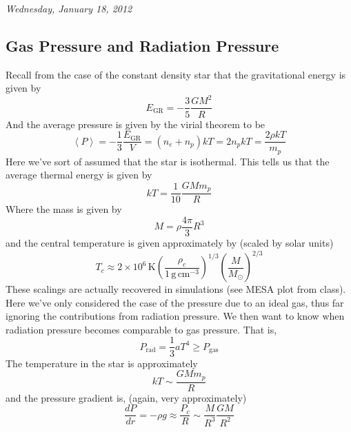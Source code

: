 \documentclass[10pt]{article}
\numberwithin{equation}{section}
\newcommand{\n}{\noindent}
\newcommand{\avg}[1]{\left\langle#1\right\rangle}
\begin{document}
\n\textit{Wednesday, January 18, 2012}
	\subsection{Gas Pressure and Radiation Pressure}
		Recall from the case of the constant density star that the 
gravitational energy is given by
		\begin{equation}
			\label{GPRP.1} E_{\mathrm{GR}}=-\frac{3}{5}\frac{GM^2}{R}
		\end{equation}
		And the average pressure is given by the virial theorem to be
		\begin{equation}
			\label{GPRP.2} \avg{P}=-\frac{1}{3}\frac{E_{\mathrm{GR}}}{V}=
(n_e+n_p)kT=2n_pkT=\frac{2\rho kT}{m_p}
		\end{equation}
		Here we've sort of assumed that the star is
                isothermal. This tells us that the average thermal
                energy is given by
		\begin{equation}
			\label{GPRP.3} kT=\frac{1}{10}\frac{GMm_p}{R}
		\end{equation}
		Where the mass is given by
		\begin{equation}
			\label{GPRP.4} M=\rho\frac{4\pi}{3}R^3
		\end{equation}
		and the central temperature is given approximately by (scaled by 
solar units)
		\begin{equation}
			\label{GPRP.5} T_c\approx2\times 10^6\,\mathrm{K}\left(\frac
{\rho_c}{1\,\mathrm{g\,cm^{-3}}}\right)^{1/3}\left(\frac{M}{M_\odot}\right)
^{2/3}
		\end{equation}
		These scalings are actually recovered in simulations
                (see MESA plot from class). Here we've only considered
                the case of the pressure due to an ideal gas, thus far
                ignoring the contributions from radiation pressure. We
                then want to know when radiation pressure becomes
                comparable to gas pressure. That is,
		\begin{equation}
			\label{GPRP.6} P_{\mathrm{rad}}=\frac{1}{3} aT^4\geq P_{\mathrm
{gas}}
		\end{equation}
		The temperature in the star is approximately
		\begin{equation}
			\label{GPRP.7} kT\sim\frac{GMm_p}{R}
		\end{equation}
		and the pressure gradient is, (again, very approximately)
		\begin{equation}
			\label{GPRP.8} \frac{dP}{dr}=-\rho g\approx \frac{P_c}{R}\sim
\frac{M}{R^3}\frac{GM}{R^2}
		\end{equation}
\end{document}
